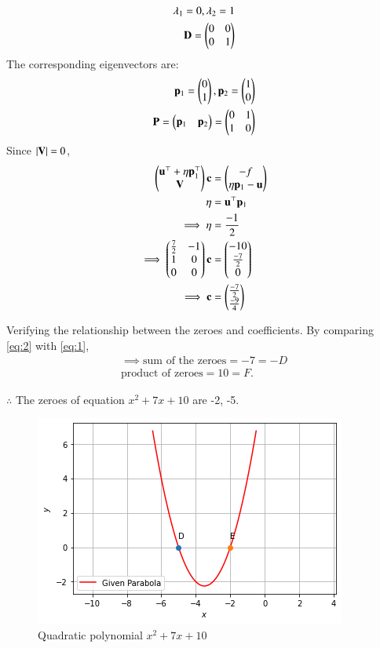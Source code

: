 \documentclass[journal,12pt,twocolumn]{IEEEtran}
\begin{document}
\begin{align}
    \lambda_1 = 0 , \lambda_2 = 1\\
    \mathbf{D} = \begin{pmatrix}0 & 0\\0 & 1\end{pmatrix}
\end{align}
The corresponding eigenvectors are:
\begin{align}
    \mathbf{p}_1 = \begin{pmatrix}0\\1\end{pmatrix} , \mathbf{p}_2 = \begin{pmatrix}1\\0\end{pmatrix}\\
    \mathbf{P} = \begin{pmatrix}\mathbf{p}_1 & \mathbf{p}_2\end{pmatrix} = \begin{pmatrix}0 & 1\\1 & 0\end{pmatrix}
\end{align}
Since $\vert\mathbf{V}\vert = 0$,
\begin{align}
    \begin{pmatrix}\mathbf{u}^\top+\eta \mathbf{p}_1^\top\\\mathbf{V}\end{pmatrix}\mathbf{c} &= \begin{pmatrix}-f\\\eta \mathbf{p}_1-\mathbf{u}\end{pmatrix}\\
    \eta &= \mathbf{u}^\top \mathbf{p}_1\\
    \implies \eta &= \frac{-1}{2}\\
    \implies \begin{pmatrix}\frac{7}{2}&-1\\1&0\\0&0\end{pmatrix}\mathbf{c} &= \begin{pmatrix}-10\\\frac{-7}{2}\\0\end{pmatrix}\\
    \implies \mathbf{c} &= \begin{pmatrix}\frac{-7}{2}\\\frac{-9}{4}\end{pmatrix}
\end{align}

Verifying the relationship between the zeroes and coefficients. By comparing \eqref{eq:2} with \eqref{eq:1},
\begin{align}
    \implies \text{sum of the zeroes} = -7 = -D\\
    \text{product of zeroes} = 10 = F.
\end{align}

$\therefore$ The zeroes of equation $x^2+7x+10$ are -2, -5.


\begin{figure}[htp]
    \centering
    \includegraphics[width=\columnwidth]{a_5_final.png}
    \caption{Quadratic polynomial $x^2+7x+10$}
    \label{fig:my_label}
\end{figure}
\end{document}
